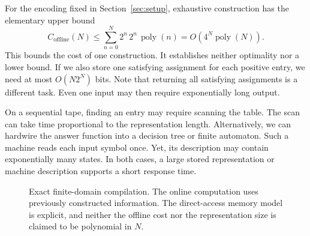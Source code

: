 \documentclass[11pt,a4paper]{article}
\numberwithin{equation}{section}
\newcommand{\SAT}{\mathrm{SAT}}
\newcommand{\ind}{\mathbf{1}}
\newcommand{\poly}{\operatorname{poly}}
\theoremstyle{plain}
\theoremstyle{definition}
\theoremstyle{remark}
\begin{document}
For the encoding fixed in Section~\ref{sec:setup}, exhaustive construction has the elementary upper bound
\begin{equation}
C_{\mathrm{offline}}(N)
\leq\sum_{n=0}^{N}2^n\,2^n\,\poly(n)
=O\!\left(4^N\poly(N)\right).
\label{eq:offline}
\end{equation}
This bounds the cost of one construction. It establishes neither optimality nor a lower bound. If we also store one satisfying assignment for each positive entry, we need at most $O(N2^N)$ bits. Note that returning all satisfying assignments is a different task. Even one input may then require exponentially long output.

On a sequential tape, finding an entry may require scanning the table. The scan can take time proportional to the representation length. Alternatively, we can hardwire the answer function into a decision tree or finite automaton. Such a machine reads each input symbol once. Yet, its description may contain exponentially many states. In both cases, a large stored representation or machine description supports a short response time.

\begin{figure}[!htbp]
\centering
{}
\caption{Exact finite-domain compilation. The online computation uses previously constructed information. The direct-access memory model is explicit, and neither the offline cost nor the representation size is claimed to be polynomial in $N$.}
\label{fig:compile}
\end{figure}
\end{document}
